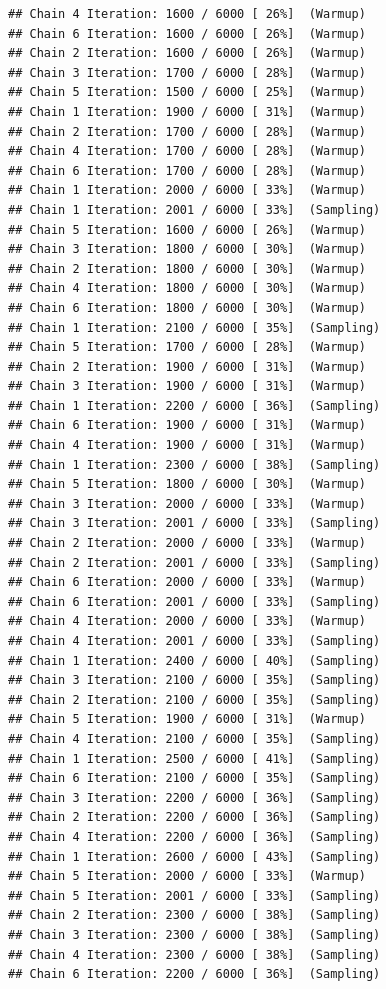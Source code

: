\documentclass[
]{article}
\begin{document}
\begin{verbatim}
## Chain 4 Iteration: 1600 / 6000 [ 26%]  (Warmup) 
## Chain 6 Iteration: 1600 / 6000 [ 26%]  (Warmup) 
## Chain 2 Iteration: 1600 / 6000 [ 26%]  (Warmup) 
## Chain 3 Iteration: 1700 / 6000 [ 28%]  (Warmup) 
## Chain 5 Iteration: 1500 / 6000 [ 25%]  (Warmup) 
## Chain 1 Iteration: 1900 / 6000 [ 31%]  (Warmup) 
## Chain 2 Iteration: 1700 / 6000 [ 28%]  (Warmup) 
## Chain 4 Iteration: 1700 / 6000 [ 28%]  (Warmup) 
## Chain 6 Iteration: 1700 / 6000 [ 28%]  (Warmup) 
## Chain 1 Iteration: 2000 / 6000 [ 33%]  (Warmup) 
## Chain 1 Iteration: 2001 / 6000 [ 33%]  (Sampling) 
## Chain 5 Iteration: 1600 / 6000 [ 26%]  (Warmup) 
## Chain 3 Iteration: 1800 / 6000 [ 30%]  (Warmup) 
## Chain 2 Iteration: 1800 / 6000 [ 30%]  (Warmup) 
## Chain 4 Iteration: 1800 / 6000 [ 30%]  (Warmup) 
## Chain 6 Iteration: 1800 / 6000 [ 30%]  (Warmup) 
## Chain 1 Iteration: 2100 / 6000 [ 35%]  (Sampling) 
## Chain 5 Iteration: 1700 / 6000 [ 28%]  (Warmup) 
## Chain 2 Iteration: 1900 / 6000 [ 31%]  (Warmup) 
## Chain 3 Iteration: 1900 / 6000 [ 31%]  (Warmup) 
## Chain 1 Iteration: 2200 / 6000 [ 36%]  (Sampling) 
## Chain 6 Iteration: 1900 / 6000 [ 31%]  (Warmup) 
## Chain 4 Iteration: 1900 / 6000 [ 31%]  (Warmup) 
## Chain 1 Iteration: 2300 / 6000 [ 38%]  (Sampling) 
## Chain 5 Iteration: 1800 / 6000 [ 30%]  (Warmup) 
## Chain 3 Iteration: 2000 / 6000 [ 33%]  (Warmup) 
## Chain 3 Iteration: 2001 / 6000 [ 33%]  (Sampling) 
## Chain 2 Iteration: 2000 / 6000 [ 33%]  (Warmup) 
## Chain 2 Iteration: 2001 / 6000 [ 33%]  (Sampling) 
## Chain 6 Iteration: 2000 / 6000 [ 33%]  (Warmup) 
## Chain 6 Iteration: 2001 / 6000 [ 33%]  (Sampling) 
## Chain 4 Iteration: 2000 / 6000 [ 33%]  (Warmup) 
## Chain 4 Iteration: 2001 / 6000 [ 33%]  (Sampling) 
## Chain 1 Iteration: 2400 / 6000 [ 40%]  (Sampling) 
## Chain 3 Iteration: 2100 / 6000 [ 35%]  (Sampling) 
## Chain 2 Iteration: 2100 / 6000 [ 35%]  (Sampling) 
## Chain 5 Iteration: 1900 / 6000 [ 31%]  (Warmup) 
## Chain 4 Iteration: 2100 / 6000 [ 35%]  (Sampling) 
## Chain 1 Iteration: 2500 / 6000 [ 41%]  (Sampling) 
## Chain 6 Iteration: 2100 / 6000 [ 35%]  (Sampling) 
## Chain 3 Iteration: 2200 / 6000 [ 36%]  (Sampling) 
## Chain 2 Iteration: 2200 / 6000 [ 36%]  (Sampling) 
## Chain 4 Iteration: 2200 / 6000 [ 36%]  (Sampling) 
## Chain 1 Iteration: 2600 / 6000 [ 43%]  (Sampling) 
## Chain 5 Iteration: 2000 / 6000 [ 33%]  (Warmup) 
## Chain 5 Iteration: 2001 / 6000 [ 33%]  (Sampling) 
## Chain 2 Iteration: 2300 / 6000 [ 38%]  (Sampling) 
## Chain 3 Iteration: 2300 / 6000 [ 38%]  (Sampling) 
## Chain 4 Iteration: 2300 / 6000 [ 38%]  (Sampling) 
## Chain 6 Iteration: 2200 / 6000 [ 36%]  (Sampling) 

\end{verbatim}
\end{document}
